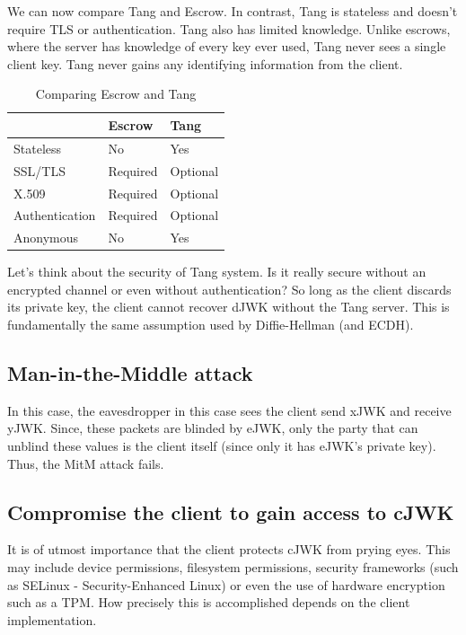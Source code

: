 We can now compare Tang and Escrow. In contrast, Tang is stateless and doesn't require TLS or authentication.
Tang also has limited knowledge. Unlike escrows, where the server has knowledge of every key ever used, Tang never sees a single client key.
Tang never gains any identifying information from the client.

\begin{table}[h]
\centering
\label{compare}
\begin{tabular}{@{}lll@{}}
\toprule
               & Escrow   & Tang                         \\ \midrule
Stateless      & No       & Yes                          \\
SSL/TLS        & Required & Optional                     \\
X.509          & Required & Optional                     \\
Authentication & Required & Optional                     \\
Anonymous      & No       & Yes                          \\ \bottomrule
\end{tabular}
\caption{Comparing Escrow and Tang}
\end{table}

Let's think about the security of Tang system. Is it really secure without an encrypted channel or even without authentication?
So long as the client discards its private key, the client cannot recover dJWK without the Tang server.
This is fundamentally the same assumption used by Diffie-Hellman (and ECDH).

\subsection{Man-in-the-Middle attack}
In this case, the eavesdropper in this case sees the client send xJWK and receive yJWK.
Since, these packets are blinded by eJWK, only the party that can unblind these values is the client itself (since only it has eJWK's private key).
Thus, the MitM attack fails.
\subsection{Compromise the client to gain access to cJWK}
It is of utmost importance that the client protects cJWK from prying eyes.
This may include device permissions, filesystem permissions, security frameworks (such as SELinux - Security-Enhanced Linux) or even the use of hardware encryption such as a TPM.
How precisely this is accomplished depends on the client implementation.
